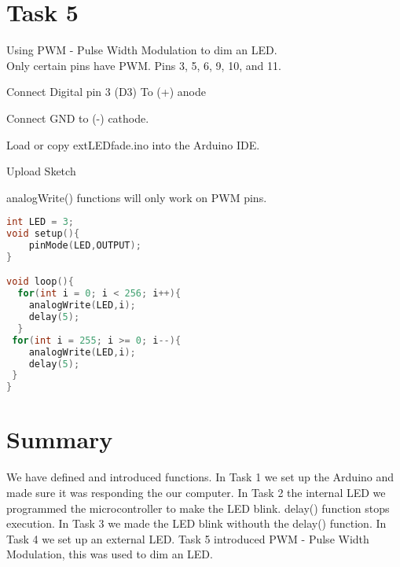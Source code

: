 \documentclass[12pt]{article}
\begin{document}
\section*{Task 5}
Using PWM - Pulse Width Modulation to dim an LED. \\
Only certain pins have PWM. Pins 3, 5, 6, 9, 10, and 11. 
\begin{todolist}
    \item Connect Digital pin 3 (D3) To (+) anode
    \item Connect GND to  (-) cathode.  
    \item Load or copy extLEDfade.ino into the Arduino IDE. 
    \item Upload Sketch 
\end{todolist}
analogWrite() functions will only work on PWM pins. 
\begin{lstlisting}[language=c++,caption={extLEDfade.ino}]
int LED = 3; 
void setup(){
	pinMode(LED,OUTPUT);
}

void loop(){
  for(int i = 0; i < 256; i++){
    analogWrite(LED,i);
    delay(5);
  }
 for(int i = 255; i >= 0; i--){
    analogWrite(LED,i);
    delay(5);
 }
}
\end{lstlisting}
\section*{Summary}
We have defined and introduced functions. In Task 1 we set up the Arduino and made sure it was responding the our computer. In Task 2 the internal LED we programmed the microcontroller to make the LED blink. delay() function stops execution. In Task 3 we made the LED blink withouth the delay() function. In Task 4 we set up an external LED. Task 5 introduced PWM - Pulse Width Modulation, this was used to dim an LED. 
\end{document}
